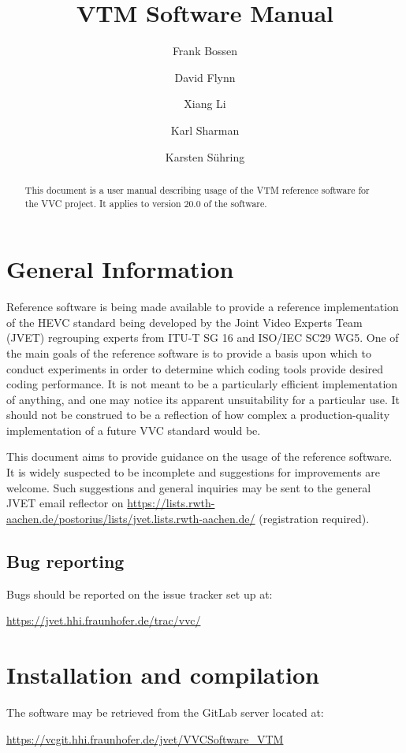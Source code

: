\documentclass[a4paper,11pt]{jvetdoc}
\title{VTM Software Manual}
\author{%
	Frank Bossen
	\email{frank@bossentech.com}
	\and
	David Flynn
	\and
	Xiang Li
	\email{xlxiangli@google.com}
	\and
	Karl Sharman
	\email{karl.sharman@eu.sony.com}
	\and
	Karsten S\"uhring
	\email{karsten.suehring@hhi.fraunhofer.de}
}
\begin{document}
\maketitle
\begin{abstract}
This document is a user manual describing usage of the VTM reference software
for the VVC project. It applies to version 20.0 of the software.
\end{abstract}

\tableofcontents
\listoftables


\section{General Information}
Reference software is being made available to provide a reference
implementation of the HEVC standard being developed by the Joint 
Video Experts Team (JVET) regrouping experts from
ITU-T SG 16 and ISO/IEC SC29 WG5. One of the main goals of the
reference software is to provide a basis upon which to conduct
experiments in order to determine which coding tools provide desired
coding performance. It is not meant to be a particularly efficient
implementation of anything, and one may notice its apparent
unsuitability for a particular use. It should not be construed to be a
reflection of how complex a production-quality implementation of a
future VVC standard would be.

This document aims to provide guidance on the usage of the reference
software. It is widely suspected to be incomplete and suggestions for
improvements are welcome. Such suggestions and general inquiries may be
sent to the general JVET email reflector on
\url{https://lists.rwth-aachen.de/postorius/lists/jvet.lists.rwth-aachen.de/} 
(registration required).

\subsection*{Bug reporting}
Bugs should be reported on the issue tracker set up at:

\url{https://jvet.hhi.fraunhofer.de/trac/vvc/}

\section{Installation and compilation}
The software may be retrieved from the GitLab server located at:

\url{https://vcgit.hhi.fraunhofer.de/jvet/VVCSoftware_VTM}
\end{document}
